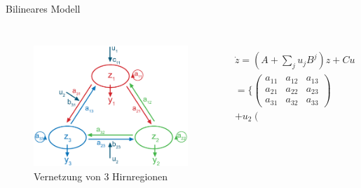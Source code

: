 \documentclass{beamer}
\begin{document}
	\begin{frame}{Bilineares Modell}
			\begin{columns}
				\column[t]{5cm}
				\begin{figure}
					\centering
					\includegraphics[width=1.6\linewidth]{res/bilinearesModell_klein.eps}
					\\Vernetzung von 3 Hirnregionen
					\label{fig: bilinearesModel}
				\end{figure}
				\column[t]{8cm}
				\begin{center}
					\\
					\vspace{0.20cm}
					\begin{equation*}
						\begin{split}
							\dot{z}=(A+\sum_{j}u_jB^j)z+Cu \\
							=\Bigg\{\left(\begin{array}{ccc} a_{11} &  a_{12} & a_{13} \\a_{21} &  a_{22} & a_{23} \\a_{31} &  a_{32} & a_{33} \end{array}\right)\\+u_2\left(\begin{array}{ccc} 

\end{array}
\end{split}
\end{equation*}
\end{center}
\end{columns}
\end{frame}
\end{document}
